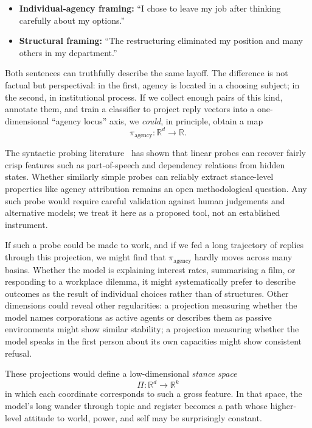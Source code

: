 \documentclass[12pt,a4paper]{article}
\begin{document}
\begin{itemize}
  \item \textbf{Individual-agency framing:} ``I chose to leave my job after thinking carefully about my options.''
  \item \textbf{Structural framing:} ``The restructuring eliminated my position and many others in my department.''
\end{itemize}

Both sentences can truthfully describe the same layoff. The difference is not factual but perspectival: in the first, agency is located in a choosing subject; in the second, in institutional process. If we collect enough pairs of this kind, annotate them, and train a classifier to project reply vectors into a one-dimensional ``agency locus'' axis, we \emph{could}, in principle, obtain a map
\[
\pi_{\text{agency}} : \mathbb{R}^d \to \mathbb{R}.
\]

The syntactic probing literature~\cite{belinkov_glass, hewitt_manning} has shown that linear probes can recover fairly crisp features such as part-of-speech and dependency relations from hidden states. Whether similarly simple probes can reliably extract stance-level properties like agency attribution remains an open methodological question. Any such probe would require careful validation against human judgements and alternative models; we treat it here as a proposed tool, not an established instrument.

If such a probe could be made to work, and if we fed a long trajectory of replies through this projection, we might find that $\pi_{\text{agency}}$ hardly moves across many basins. Whether the model is explaining interest rates, summarising a film, or responding to a workplace dilemma, it might systematically prefer to describe outcomes as the result of individual choices rather than of structures. Other dimensions could reveal other regularities: a projection measuring whether the model names corporations as active agents or describes them as passive environments might show similar stability; a projection measuring whether the model speaks in the first person about its own capacities might show consistent refusal.

These projections would define a low-dimensional \emph{stance space}
\[
\Pi : \mathbb{R}^d \to \mathbb{R}^k
\]
in which each coordinate corresponds to such a gross feature. In that space, the model's long wander through topic and register becomes a path whose higher-level attitude to world, power, and self may be surprisingly constant.
\end{document}
